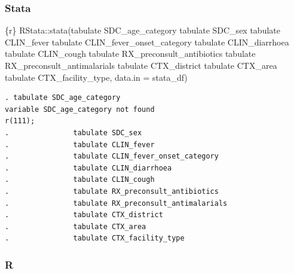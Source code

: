 \documentclass[
  letterpaper,
  DIV=11,
  numbers=noendperiod,
  oneside]{scrreprt}
\newenvironment{Shaded}{\begin{snugshade}}{\end{snugshade}}
\newcommand{\AttributeTok}[1]{\textcolor[rgb]{0.40,0.45,0.13}{#1}}
\newcommand{\FunctionTok}[1]{\textcolor[rgb]{0.28,0.35,0.67}{#1}}
\newcommand{\InformationTok}[1]{\textcolor[rgb]{0.37,0.37,0.37}{#1}}
\newcommand{\NormalTok}[1]{\textcolor[rgb]{0.00,0.23,0.31}{#1}}
\newcommand{\SpecialCharTok}[1]{\textcolor[rgb]{0.37,0.37,0.37}{#1}}
\newcommand{\StringTok}[1]{\textcolor[rgb]{0.13,0.47,0.30}{#1}}
\begin{document}
\subsubsection{Stata}

\begin{Shaded}
\begin{Highlighting}[]
\InformationTok{\textasciigrave{}\textasciigrave{}\textasciigrave{}\{r\}}
\NormalTok{RStata}\SpecialCharTok{::}\FunctionTok{stata}\NormalTok{(}\StringTok{\textquotesingle{}tabulate SDC\_age\_category}
\StringTok{              tabulate SDC\_sex}
\StringTok{              tabulate CLIN\_fever}
\StringTok{              tabulate CLIN\_fever\_onset\_category}
\StringTok{              tabulate CLIN\_diarrhoea}
\StringTok{              tabulate CLIN\_cough}
\StringTok{              tabulate RX\_preconsult\_antibiotics}
\StringTok{              tabulate RX\_preconsult\_antimalarials}
\StringTok{              tabulate CTX\_district}
\StringTok{              tabulate CTX\_area}
\StringTok{              tabulate CTX\_facility\_type\textquotesingle{}}\NormalTok{,}
              \AttributeTok{data.in =}\NormalTok{ stata\_df)}
\InformationTok{\textasciigrave{}\textasciigrave{}\textasciigrave{}}
\end{Highlighting}
\end{Shaded}

\begin{verbatim}
. tabulate SDC_age_category
variable SDC_age_category not found
r(111);
.               tabulate SDC_sex
.               tabulate CLIN_fever
.               tabulate CLIN_fever_onset_category
.               tabulate CLIN_diarrhoea
.               tabulate CLIN_cough
.               tabulate RX_preconsult_antibiotics
.               tabulate RX_preconsult_antimalarials
.               tabulate CTX_district
.               tabulate CTX_area
.               tabulate CTX_facility_type
\end{verbatim}

\subsubsection{R}
\end{document}
